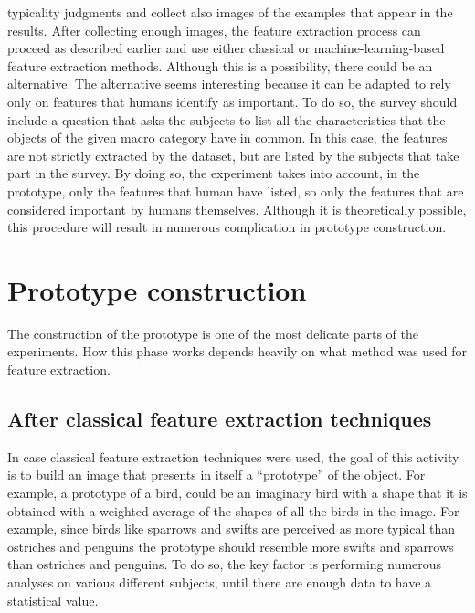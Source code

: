 \documentclass[conference]{IEEEtran}
\begin{document}
		typicality judgments and collect also images of the examples that appear in the results. After collecting enough images, the feature extraction process can proceed as described earlier and use either  
		classical or machine-learning-based feature extraction methods. Although this is a possibility, there could be an alternative. The alternative seems interesting because it can be adapted to rely only on features 
		that humans identify as important. To do so, the survey should include a question that asks the subjects to list all the characteristics that the objects of the given macro category have in common. In this case, 
		the features are not strictly extracted by the dataset, but are listed by the subjects that take part in the survey. By doing so, the experiment takes into account, in the prototype, only the features that 
		human have listed, so only the features that are considered important by humans themselves. Although it is theoretically possible, this procedure will result in numerous complication in prototype construction. 
		

	\section{Prototype construction}

		\noindent The construction of the prototype is one of the most delicate parts of the experiments. How this phase works depends heavily on what method was used for feature extraction. 
		
		\subsection{After classical feature extraction techniques\label{sec:cfet}}
		
			\noindent In case classical feature extraction techniques were used, the goal of this activity is to build an image that presents in itself a ``prototype'' of the object. For example, a prototype of a bird, could be 
			an imaginary bird with a shape that it is obtained with a weighted average of the shapes of all the birds in the image. For example, since birds like sparrows and swifts are perceived as more 
			typical than ostriches and penguins the prototype should resemble more swifts and sparrows than ostriches and penguins. To do so, the key factor is performing numerous analyses on various 
			different subjects, until there are enough data to have a statistical value. 
			
\end{document}
